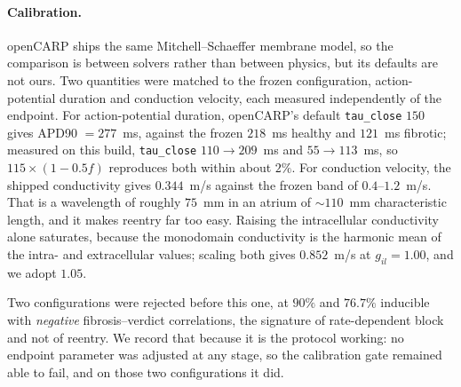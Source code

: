 \documentclass[11pt]{article}
\theoremstyle{definition}
\newcommand{\code}[1]{\texttt{#1}}
\begin{document}
\paragraph{Calibration.} openCARP ships the same Mitchell--Schaeffer membrane
model, so the comparison is between solvers rather than between physics, but its
defaults are not ours. Two quantities were matched to the frozen configuration,
action-potential duration and conduction velocity, each measured independently of
the endpoint. For action-potential duration, openCARP's
default \code{tau\_close} $150$ gives APD90 $=277$~ms, against the frozen
$218$~ms healthy and $121$~ms fibrotic; measured on this build, \code{tau\_close}
$110\to209$~ms and $55\to113$~ms, so $115\times(1-0.5f)$ reproduces both within
about $2\%$. For conduction velocity, the shipped conductivity gives $0.344$~m/s
against the frozen band of $0.4$--$1.2$~m/s. That is a wavelength of roughly
$75$~mm in an atrium of $\sim\!110$~mm characteristic length, and it makes reentry
far too easy. Raising the intracellular conductivity alone saturates, because the
monodomain conductivity is the harmonic mean of the intra- and extracellular
values; scaling both gives $0.852$~m/s at $g_{il}=1.00$, and we adopt $1.05$.

Two configurations were rejected before this one, at $90\%$ and $76.7\%$
inducible with \emph{negative} fibrosis--verdict correlations, the signature of
rate-dependent block and not of reentry. We record that because it is the
protocol working: no endpoint parameter was adjusted at any stage, so the
calibration gate remained able to fail, and on those two configurations it did.
\end{document}
